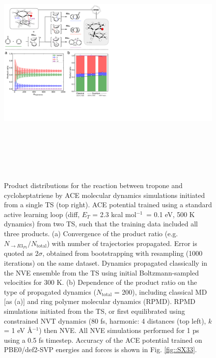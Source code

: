 \documentclass[twoside,twocolumn,9pt]{article}
\newcommand{\kcal}{kcal mol$^{-1}$}
\begin{document}
\begin{figure}[b]
	\centering
	\includegraphics[height=12.5cm]{figX2}
	\caption{Product distributions for the reaction between tropone and cycloheptatriene by ACE molecular dynamics simulations initiated from a single TS (top right). ACE potential trained using a standard active learning loop (diff, $E_T$ = 2.3 \kcal~= 0.1 eV, 500 K dynamics) from two TS, such that the training data included all three products. (a) Convergence of the product ratio (e.g. $N_{\rightarrow R3_{P1}} / N_\text{total}$) with number of trajectories propagated. Error is quoted as $2\sigma$, obtained from bootstrapping with resampling (1000 iterations) on the same dataset. Dynamics propagated classically in the NVE ensemble from the TS using initial Boltzmann-sampled velocities for 300 K. (b) Dependence of the product ratio on the type of propagated dynamics ($N_\text{total}$ = 200), including classical MD [as (a)] and ring polymer molecular dynamics (RPMD). RPMD simulations initiated from the TS, or first equilibrated using constrained NVT dynamics (80 fs, harmonic: 4 distances (top left), $k$ = 1 eV \AA${}^{-1}$) then NVE. All NVE simulations performed for 1 ps using a 0.5 fs timestep. Accuracy of the ACE potential trained on PBE0/def2-SVP energies and forces is shown in Fig. \ref{fig::SX33}.}
	\label{fig::X2}
\end{figure}
\end{document}
